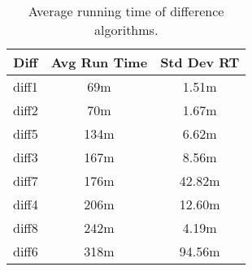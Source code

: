\begin{table}[tbph]
\begin{center}
\begin{tabular}{|c||c|c|}
\hline
Diff & Avg Run Time & Std Dev RT  \\
\hline
\hline
diff1 & 69m & 1.51m \\
diff2 & 70m & 1.67m \\
diff5 & 134m & 6.62m \\
diff3 & 167m & 8.56m \\
diff7 & 176m & 42.82m \\
diff4 & 206m & 12.60m \\
diff8 & 242m & 4.19m \\
diff6 & 318m & 94.56m \\
\hline
\end{tabular}
\end{center}
\caption{Average running time of difference algorithms.}
\label{tab:difftiming}
\end{table}
